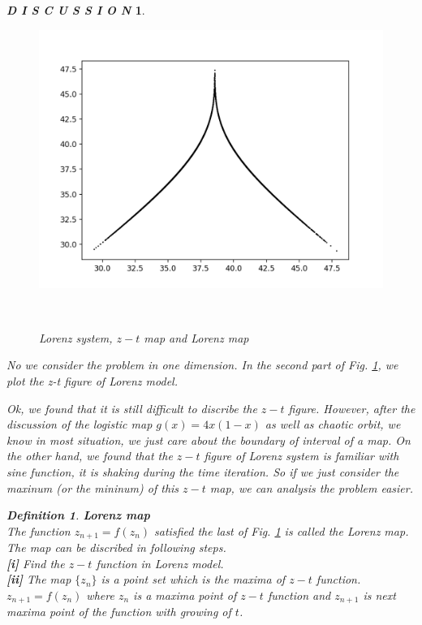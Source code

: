 \documentclass[12pt]{article}
\theoremstyle{plain}
\newtheorem{definition}{{\color{red}\textbf{Definition}}}[section]
\newtheorem{discussion}{\textit{D I S C U S S I O N}}[section]
\begin{document}
\begin{discussion}
\begin{figure}[H]
\begin{minipage}[c][0.29\width]{0.29\textwidth}
   \includegraphics[width=\textwidth]{figure/section2/Lorenz-map.png}
\end{minipage}
\\[3ex]\caption{Lorenz system, $z-t$ map and Lorenz map}\label{Lorenz-map}
\end{figure}


No we consider the problem in one dimension. In the second part of Fig. \ref{Lorenz-map}, we plot the z-t figure of Lorenz model. 

Ok, we found that it is still difficult to discribe the $z-t$ figure. However, after the discussion of the logistic map $g(x) = 4x(1-x)$ as well as chaotic orbit, we know in most situation, we just care about the boundary of interval of a map. On the other hand, we found that the $z-t$ figure of Lorenz system is familiar with sine function, it is shaking during the time iteration. So if we just consider the maxinum (or the mininum) of this $z-t$ map, we can analysis the problem easier.




\begin{definition}\textbf{Lorenz map}
\\\noindent The function $z_{n+1} = f(z_n)$ satisfied the last of Fig. \ref{Lorenz-map} is called the Lorenz map. The map can be discribed in following steps.
\\\noindent \textbf{[i]} Find the $z-t$ function in Lorenz model.
\\\noindent \textbf{[ii]} The map $\{z_n\}$ is a point set which is the maxima of $z-t$ function. $z_{n+1} = f(z_n)$ where $z_{n}$ is a maxima point of $z-t$ function and $z_{n+1}$ is next maxima point of the function with growing of $t$.
\end{definition}





\end{discussion}
\end{document}
